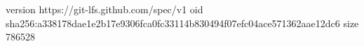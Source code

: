 version https://git-lfs.github.com/spec/v1
oid sha256:a338178dae1e2b17e9306fca0fc33114b830494f07efc04ace571362aae12dc6
size 786528
